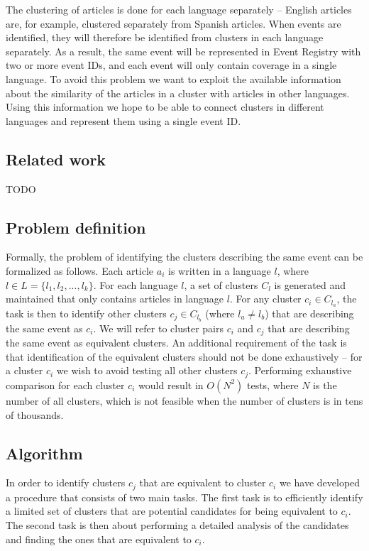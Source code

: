 \documentclass[twoside,11pt]{article}
\begin{document}
The clustering of articles is done for each language separately -- English articles are, for example, clustered separately from Spanish articles. When events are identified, they will therefore be identified from clusters in each language separately. As a result, the same event will be represented in Event Registry with two or more event IDs, and each event will only contain coverage in a single language. To avoid this problem we want to exploit the available information about the similarity of the articles in a cluster with articles in other languages. Using this information we hope to be able to connect clusters in different languages and represent them using a single event ID.

\subsection{Related work}

TODO

\subsection{Problem definition}

Formally, the problem of identifying the clusters describing the same event can be formalized as follows. Each article $a_i$ is written in a language $l$, where $l \in L = \{l_1,l_2,...,l_k\}$. For each language $l$, a set of clusters $C_l$ is generated and maintained that only contains articles in language $l$. For any cluster $c_i \in C_{l_a}$, the task is then to identify other clusters $c_j \in C_{l_b}$ (where $l_a \neq l_b$) that are describing the same event as $c_i$. We will refer to cluster pairs $c_i$ and $c_j$ that are describing the same event as equivalent clusters. An additional requirement of the task is that identification of the equivalent clusters should not be done exhaustively -- for a cluster $c_i$ we wish to avoid testing all other clusters $c_j$. Performing exhaustive comparison for each cluster $c_i$ would result in $O(N^2)$ tests, where $N$ is the number of all clusters, which is not feasible when the number of clusters is in tens of thousands.

\subsection{Algorithm}

In order to identify clusters $c_j$ that are equivalent to cluster $c_i$ we have developed a procedure that consists of two main tasks. The first task is to efficiently identify a limited set of clusters that are potential candidates for being equivalent to $c_i$. The second task is then about performing a detailed analysis of the candidates and finding the ones that are equivalent to $c_i$.
\end{document}
